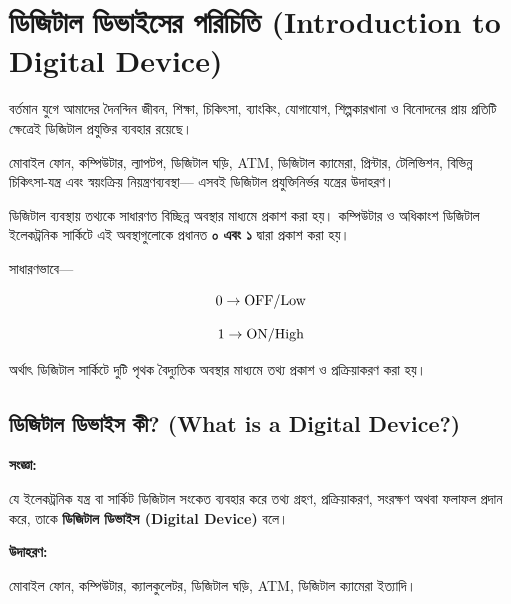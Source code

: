 
\section{ডিজিটাল ডিভাইসের পরিচিতি
(\textenglish{Introduction to Digital Device})}

বর্তমান যুগে আমাদের দৈনন্দিন জীবন, শিক্ষা, চিকিৎসা, ব্যাংকিং,
যোগাযোগ, শিল্পকারখানা ও বিনোদনের প্রায় প্রতিটি ক্ষেত্রেই
ডিজিটাল প্রযুক্তির ব্যবহার রয়েছে।

মোবাইল ফোন, কম্পিউটার, ল্যাপটপ, ডিজিটাল ঘড়ি,
\textenglish{ATM}, ডিজিটাল ক্যামেরা, প্রিন্টার,
টেলিভিশন, বিভিন্ন চিকিৎসা-যন্ত্র এবং স্বয়ংক্রিয় নিয়ন্ত্রণব্যবস্থা—
এসবই ডিজিটাল প্রযুক্তিনির্ভর যন্ত্রের উদাহরণ।

ডিজিটাল ব্যবস্থায় তথ্যকে সাধারণত বিচ্ছিন্ন অবস্থার মাধ্যমে প্রকাশ করা হয়।
কম্পিউটার ও অধিকাংশ ডিজিটাল ইলেকট্রনিক সার্কিটে
এই অবস্থাগুলোকে প্রধানত \textbf{০ এবং ১} দ্বারা প্রকাশ করা হয়।

সাধারণভাবে—

\[
0 \rightarrow \text{\textenglish{OFF/Low}}
\]

\[
1 \rightarrow \text{\textenglish{ON/High}}
\]

অর্থাৎ ডিজিটাল সার্কিটে দুটি পৃথক বৈদ্যুতিক অবস্থার মাধ্যমে
তথ্য প্রকাশ ও প্রক্রিয়াকরণ করা হয়।


\subsection{ডিজিটাল ডিভাইস কী?
(\textenglish{What is a Digital Device?})}

\par\begingroup

\textbf{সংজ্ঞা:}

যে ইলেকট্রনিক যন্ত্র বা সার্কিট ডিজিটাল সংকেত ব্যবহার করে
তথ্য গ্রহণ, প্রক্রিয়াকরণ, সংরক্ষণ অথবা ফলাফল প্রদান করে,
তাকে \textbf{ডিজিটাল ডিভাইস
(\textenglish{Digital Device})} বলে।
\par\endgroup


\textbf{\textcolor{ICTOrange}{উদাহরণ:}}

মোবাইল ফোন, কম্পিউটার, ক্যালকুলেটর, ডিজিটাল ঘড়ি,
\textenglish{ATM}, ডিজিটাল ক্যামেরা ইত্যাদি।

